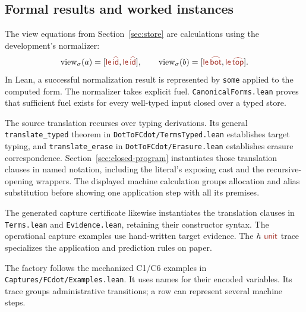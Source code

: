 \subsection*{Formal results and worked instances}
The view equations from Section~\ref{sec:store} are calculations using
the development's normalizer:
\[
 \view{a}=[\ev{le}\,\form{id},\ev{le}\,\form{id}],
 \qquad
 \view{b}=[\ev{le}\,\form{bot},\ev{le}\,\form{top}].
\]
In Lean, a successful normalization result is represented by
\texttt{some} applied to the computed form. The normalizer takes explicit
fuel. \texttt{CanonicalForms.lean} proves that sufficient fuel exists
for every well-typed input closed over a typed store.

The source translation recurses over typing derivations. Its general
\texttt{translate\_typed} theorem in
\texttt{DotToFCdot/TermsTyped.lean} establishes target typing, and
\texttt{translate\_erase} in \texttt{DotToFCdot/Erasure.lean} establishes
erasure correspondence. Section~\ref{sec:closed-program} instantiates
those translation clauses in named notation, including the literal's
exposing cast and the recursive-opening wrappers. The displayed machine
calculation groups allocation and alias substitution before showing one
application step with all its premises.

The generated capture certificate likewise instantiates the translation
clauses in \texttt{Terms.lean} and \texttt{Evidence.lean}, retaining their
constructor syntax. The operational capture examples use hand-written
target evidence. The $h\ \ev{unit}$ trace specializes the application and
prediction rules on paper.

The factory follows the mechanized C1/C6 examples in
\texttt{Captures/FCdot/Examples.lean}.
It uses names for their encoded variables. Its trace groups administrative transitions; a row can
represent several machine steps.

